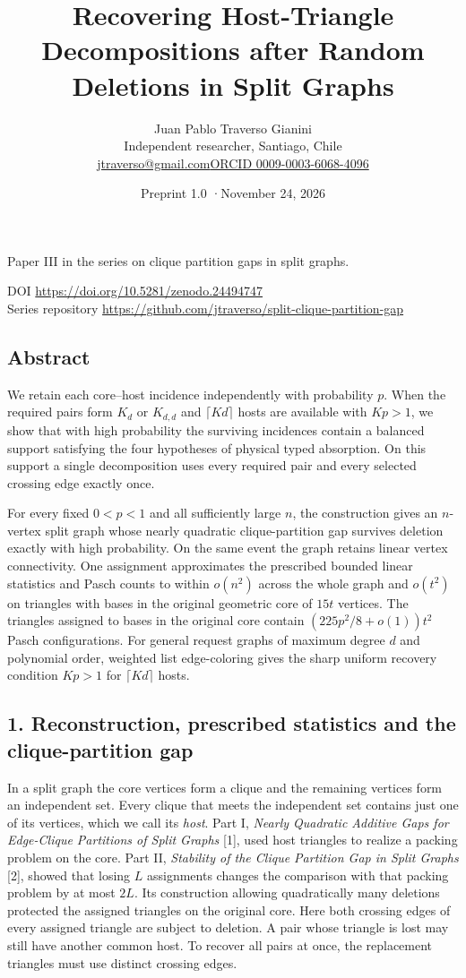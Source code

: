 \documentclass[english,11pt,a4paper]{article}
\title{Recovering Host-Triangle Decompositions after Random Deletions in Split Graphs}
\author{Juan Pablo Traverso Gianini\\\small Independent researcher, Santiago, Chile\\\small\href{mailto:jtraverso@gmail.com}{jtraverso@gmail.com}\quad\href{https://orcid.org/0009-0003-6068-4096}{ORCID 0009-0003-6068-4096}}
\date{Preprint 1.0 \enspace·\enspace November 24, 2026}
\begin{document}
\raggedbottom\maketitle
\begin{center}Paper III in the series on clique partition gaps in split graphs.\end{center}
\noindent DOI \url{https://doi.org/10.5281/zenodo.24494747}\\
Series repository \url{https://github.com/jtraverso/split-clique-partition-gap}
\subsection{Abstract}\label{abstract}

We retain each core--host incidence independently with probability \(p\). When the required pairs form \(K_d\) or \(K_{d,d}\) and \(\lceil Kd\rceil\) hosts are available with \(Kp>1\), we show that with high probability the surviving incidences contain a balanced support satisfying the four hypotheses of physical typed absorption. On this support a single decomposition uses every required pair and every selected crossing edge exactly once.

For every fixed \(0<p<1\) and all sufficiently large \(n\), the construction gives an \(n\)-vertex split graph whose nearly quadratic clique-partition gap survives deletion exactly with high probability. On the same event the graph retains linear vertex connectivity. One assignment approximates the prescribed bounded linear statistics and Pasch counts to within \(o(n^2)\) across the whole graph and \(o(t^2)\) on triangles with bases in the original geometric core of \(15t\) vertices. The triangles assigned to bases in the original core contain \((225p^2/8+o(1))t^2\) Pasch configurations. For general request graphs of maximum degree \(d\) and polynomial order, weighted list edge-coloring gives the sharp uniform recovery condition \(Kp>1\) for \(\lceil Kd\rceil\) hosts.

\subsection{1. Reconstruction, prescribed statistics and the clique-partition gap}\label{reconstruction-prescribed-statistics-and-the-clique-partition-gap}

In a split graph the core vertices form a clique and the remaining vertices form an independent set. Every clique that meets the independent set contains just one of its vertices, which we call its \emph{host}. Part I, \emph{Nearly Quadratic Additive Gaps for Edge-Clique Partitions of Split Graphs} {[}1{]}, used host triangles to realize a packing problem on the core. Part II, \emph{Stability of the Clique Partition Gap in Split Graphs} {[}2{]}, showed that losing \(L\) assignments changes the comparison with that packing problem by at most \(2L\). Its construction allowing quadratically many deletions protected the assigned triangles on the original core. Here both crossing edges of every assigned triangle are subject to deletion. A pair whose triangle is lost may still have another common host. To recover all pairs at once, the replacement triangles must use distinct crossing edges.
\end{document}

